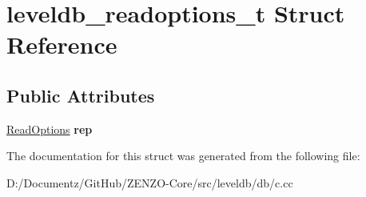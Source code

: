 \hypertarget{structleveldb__readoptions__t}{}\section{leveldb\+\_\+readoptions\+\_\+t Struct Reference}
\label{structleveldb__readoptions__t}
\subsection*{Public Attributes}
\begin{DoxyCompactItemize}
\item 
\mbox{\label{structleveldb__readoptions__t_ad4bc0f881cf2c7a859642cd878dd568c}} 
\mbox{\hyperlink{structleveldb_1_1_read_options}{Read\+Options}} {\bfseries rep}
\end{DoxyCompactItemize}


The documentation for this struct was generated from the following file\+:\begin{DoxyCompactItemize}
\item 
D\+:/\+Documentz/\+Git\+Hub/\+Z\+E\+N\+Z\+O-\/\+Core/src/leveldb/db/c.\+cc\end{DoxyCompactItemize}
